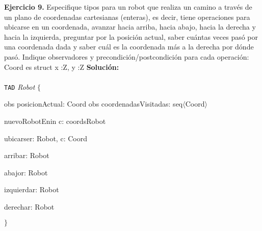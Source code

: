 \documentclass{article}
\newenvironment{tad}[1]{
	\paragraph{} \vspace*{-4mm}
	\newcommand{\obs}[2]{\texttt{obs} ##1 : ##2}

	\vspace{1ex}
	\texttt{TAD} \textit{#1} $\{$
	\par
	\tocarEspacios
}
{

\hspace{2.5mm} $\}$
\vspace{2ex}
}
\begin{document}
\textbf{Ejercicio 9.} Especifique tipos para un robot que realiza un camino a trav\'es de un plano de coordenadas cartesianas (enteras),
es decir, tiene operaciones para ubicarse en un coordenada, avanzar hacia arriba, hacia abajo, hacia la derecha y hacia la
izquierda, preguntar por la posici\'on actual, saber cu\'antas veces pas\'o por una coordenada dada y saber cu\'al es la coordenada
m\'as a la derecha por d\'onde pas\'o. Indique observadores y precondici\'on/postcondici\'on para cada operaci\'on:
Coord es struct {x :Z, y :Z}
\newpage
\textbf{Soluci\'on:}
\begin{tad}{Robot}
    obs posicionActual: Coord
    obs coordenadasVisitadas: seq$\langle$Coord$\rangle$

    \begin{proc}{nuevoRobotEn}{in c: coords}{Robot}
    \end{proc}
    
    \begin{proc}{ubicarse}{\Inout r: Robot, \In c: Coord}{}
    \end{proc}

    \begin{proc}{arriba}{\Inout r: Robot}{}
    \end{proc}

    \begin{proc}{abajo}{\Inout r: Robot}{}
    \end{proc}

    \begin{proc}{izquierda}{\Inout r: Robot}{}
    \end{proc}
    
    \begin{proc}{derecha}{\Inout r: Robot}{}
    \end{proc}


\end{tad}
\end{document}

